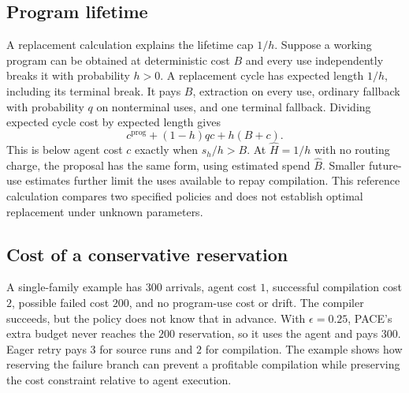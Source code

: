 \subsection{Program lifetime}
\label{sec:stationary}
A replacement calculation explains the lifetime cap $1/h$.
Suppose a working program can be obtained at deterministic cost $B$ and every use independently breaks it with probability $h>0$.
A replacement cycle has expected length $1/h$, including its terminal break.
It pays $B$, extraction on every use, ordinary fallback with probability $q$ on nonterminal uses, and one terminal fallback.
Dividing expected cycle cost by expected length gives
\begin{equation}
c^{\mathrm{prog}}+(1-h)qc+h(B+c).
\label{eq:replacement}
\end{equation}
This is below agent cost $c$ exactly when $s_h/h>B$.
At $\hat H=1/h$ with no routing charge, the proposal has the same form, using estimated spend $\hat B$.
Smaller future-use estimates further limit the uses available to repay compilation.
This reference calculation compares two specified policies and does not establish optimal replacement under unknown parameters.

\subsection{Cost of a conservative reservation}
\label{app:reservation-example}
A single-family example has $300$ arrivals, agent cost $1$, successful compilation cost $2$, possible failed cost $200$, and no program-use cost or drift.
The compiler succeeds, but the policy does not know that in advance.
With $\epsilon=0.25$, PACE's extra budget never reaches the $200$ reservation, so it uses the agent and pays $300$.
Eager retry pays $3$ for source runs and $2$ for compilation.
The example shows how reserving the failure branch can prevent a profitable compilation while preserving the cost constraint relative to agent execution.

